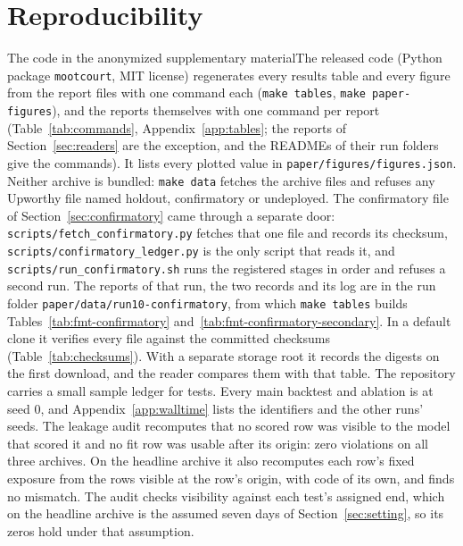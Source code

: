 \section{Reproducibility}
\label{sec:repro}
\iftmlr The code in the anonymized supplementary material\else The released code\fi{} (Python package \texttt{mootcourt}, MIT license) regenerates every results table and every figure from the report files with one command each (\texttt{make tables}, \texttt{make paper-figures}), and the reports themselves with one command per report (Table~\ref{tab:commands}, Appendix~\ref{app:tables}; the reports of Section~\ref{sec:readers} are the exception, and the READMEs of their run folders give the commands). It lists every plotted value in \texttt{paper/figures/figures.json}. Neither archive is bundled: \texttt{make data} fetches the archive files and refuses any Upworthy file named holdout, confirmatory or undeployed. The confirmatory file of Section~\ref{sec:confirmatory} came through a separate door: \texttt{scripts/fetch\_confirmatory.py} fetches that one file and records its checksum, \texttt{scripts/confirmatory\_ledger.py} is the only script that reads it, and \texttt{scripts/run\_confirmatory.sh} runs the registered stages in order and refuses a second run. The reports of that run, the two records and its log are in the run folder \texttt{paper/data/run10-confirmatory}, from which \texttt{make tables} builds Tables~\ref{tab:fmt-confirmatory} and~\ref{tab:fmt-confirmatory-secondary}. In a default clone it verifies every file against the committed checksums (Table~\ref{tab:checksums}). With a separate storage root it records the digests on the first download, and the reader compares them with that table. The repository carries a small sample ledger for tests. Every main backtest and ablation is at seed 0, and Appendix~\ref{app:walltime} lists the identifiers and the other runs' seeds. The leakage audit recomputes that no scored row was visible to the model that scored it and no fit row was usable after its origin: zero violations on all three archives. On the headline archive it also recomputes each row's fixed exposure from the rows visible at the row's origin, with code of its own, and finds no mismatch. The audit checks visibility against each test's assigned end, which on the headline archive is the assumed seven days of Section~\ref{sec:setting}, so its zeros hold under that assumption.
